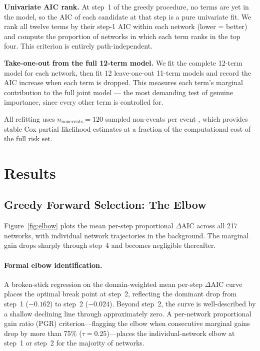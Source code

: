 \documentclass[11pt]{article}
\begin{document}
\textbf{Univariate AIC rank.} At step~1 of the greedy procedure, no terms are
yet in the model, so the AIC of each candidate at that step is a pure univariate
fit. We rank all twelve terms by their step-1 AIC within each network (lower =
better) and compute the proportion of networks in which each term ranks in the
top four. This criterion is entirely path-independent.

\textbf{Take-one-out from the full 12-term model.} We fit the complete
12-term model for each network, then fit 12 leave-one-out 11-term models
and record the AIC increase when each term is dropped. This measures each term's
marginal contribution to the full joint model --- the most demanding test of
genuine importance, since every other term is controlled for.

All refitting uses $n_{\text{nonevents}} = 120$ sampled non-events per event
\citep{lerner2020reliability}, which provides stable Cox partial likelihood
estimates at a fraction of the computational cost of the full risk set.

\section{Results}

\subsection{Greedy Forward Selection: The Elbow}

Figure~\ref{fig:elbow} plots the mean per-step proportional $\Delta$AIC
across all 217 networks, with individual network trajectories in the
background. The marginal gain drops sharply through step~4 and becomes
negligible thereafter.

\paragraph{Formal elbow identification.}
A broken-stick regression on the domain-weighted mean per-step $\Delta$AIC
curve places the optimal break point at step~2, reflecting the dominant drop
from step~1 ($-0.162$) to step~2 ($-0.024$). Beyond step~2, the curve is
well-described by a shallow declining line through approximately zero. A
per-network proportional gain ratio (PGR) criterion---flagging the elbow when
consecutive marginal gains drop by more than 75\% ($\tau = 0.25$)---places the
individual-network elbow at step~1 or step~2 for the majority of networks.
\end{document}
